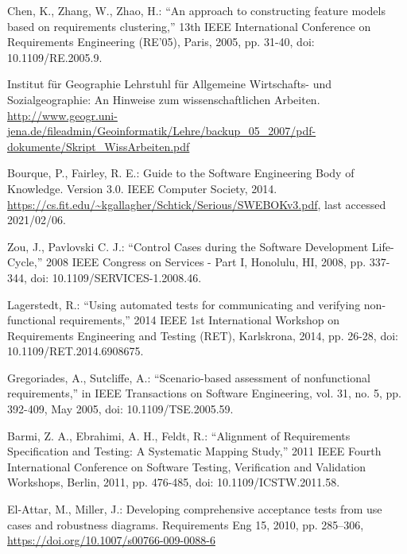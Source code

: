 \documentclass[a4paper,10pt, bibliography=totocnumbered]{scrreprt}
\begin{document}
\begin{thebibliography}{9}

 Chen, K., Zhang, W., Zhao, H.: \enquote{An approach to constructing feature models based on requirements clustering,} 13th IEEE International Conference on Requirements Engineering (RE'05), Paris, 2005, pp. 31-40, doi: 10.1109/RE.2005.9.

 Institut für Geographie   
Lehrstuhl für Allgemeine Wirtschafts- und Sozialgeographie: An Hinweise zum wissenschaftlichen Arbeiten.
\url{http://www.geogr.uni-jena.de/fileadmin/Geoinformatik/Lehre/backup_05_2007/pdf-dokumente/Skript_WissArbeiten.pdf}

 Bourque, P., Fairley, R. E.: Guide to the Software Engineering Body of Knowledge. Version 3.0.
IEEE Computer Society, 2014. \url{https://cs.fit.edu/~kgallagher/Schtick/Serious/SWEBOKv3.pdf}, last accessed 2021/02/06.

 Zou, J., Pavlovski C. J.: \enquote{Control Cases during the Software Development Life-Cycle,} 2008 IEEE Congress on Services - Part I, Honolulu, HI, 2008, pp. 337-344, doi: 10.1109/SERVICES-1.2008.46.

 Lagerstedt, R.: \enquote{Using automated tests for communicating and verifying non-functional requirements,} 2014 IEEE 1st International Workshop on Requirements Engineering and Testing (RET), Karlskrona, 2014, pp. 26-28, doi: 10.1109/RET.2014.6908675.

 Gregoriades, A., Sutcliffe, A.: \enquote{Scenario-based assessment of nonfunctional requirements,} in IEEE Transactions on Software Engineering, vol. 31, no. 5, pp. 392-409, May 2005, doi: 10.1109/TSE.2005.59.

 Barmi, Z. A., Ebrahimi, A. H., Feldt, R.: \enquote{Alignment of Requirements Specification and Testing: A Systematic Mapping Study,} 2011 IEEE Fourth International Conference on Software Testing, Verification and Validation Workshops, Berlin, 2011, pp. 476-485, doi: 10.1109/ICSTW.2011.58.

 El-Attar, M., Miller, J.: Developing comprehensive acceptance tests from use cases and robustness diagrams. Requirements Eng 15, 2010, pp. 285–306, \url{https://doi.org/10.1007/s00766-009-0088-6}


\end{thebibliography}
\end{document}
